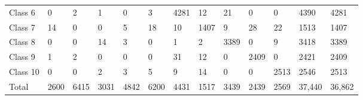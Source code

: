 \documentclass[jimaging,article,accept,pdftex,oneauthor]{Definitions/mdpi}
\begin{document}
\begin{table}[H]
\begin{tabularx}{\textwidth}{ p{1.3cm}  X  X  X  X  X  X  X  X  X  X  p{0.6cm}  p{0.8cm} }
    Class 6 & 0 & 2 & 1 & 0 & 3 & {4281} & 12 & 21 & 0 & 0 & 4390 & 4281 \\ 
     Class 7 & 14 & 0 & 0 & 5 & 18 & 10 & {1407} & 9 & 28 & 22 & 1513 & 1407 \\     
     Class 8 & 0 & 0 & 14 & 3 & 0 & 1 & 2 & {3389} & 0 & 9 & 3418 & 3389\\  
     Class 9 & 1 & 2 & 0 & 0 & 0 & 31 & 12 & 0 & {2409} & 0 & 2421 & 2409\\   
     Class 10 & 0 & 0 & 2 & 3 & 5 & 9 & 14 & 0 & 0 & {2513} & 2546 & 2513\\ 
     \midrule 
     {Total} & 2600 & 6415 & 3031 & 4842 & 6200 & 4431 & 1517 & 3439 & 2439 & 2569 & {37,440} & 36,862\\ 
    \bottomrule
\end{tabularx}
\end{table}
\end{document}
